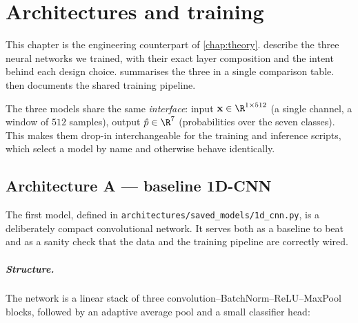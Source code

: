 \chapter{Architectures and training}
\label{chap:archi}

This chapter is the engineering counterpart of \cref{chap:theory}.
 describe the three
neural networks we trained, with their exact layer composition and the
intent behind each design choice.  summarises
the three in a single comparison table.  then
documents the shared training pipeline.

\label{chap:archi-train}

The three models share the same \emph{interface}: input
$\mathbf{x} \in \R^{1 \times 512}$ (a single channel, a window of $512$
samples), output $\hat{p} \in \R^{7}$ (probabilities over the seven
classes). This makes them drop-in interchangeable for the training and
inference scripts, which select a model by name and otherwise behave
identically.

\section{Architecture A --- baseline 1D-CNN}
\label{sec:archi-cnn}

The first model, defined in
\texttt{architectures/saved\_models/1d\_cnn.py}, is a deliberately
compact convolutional network. It serves both as a baseline to beat
and as a sanity check that the data and the training pipeline are
correctly wired.

\paragraph{Structure.} The network is a linear stack of three
convolution--BatchNorm--ReLU--MaxPool blocks, followed by an adaptive
average pool and a small classifier head:

